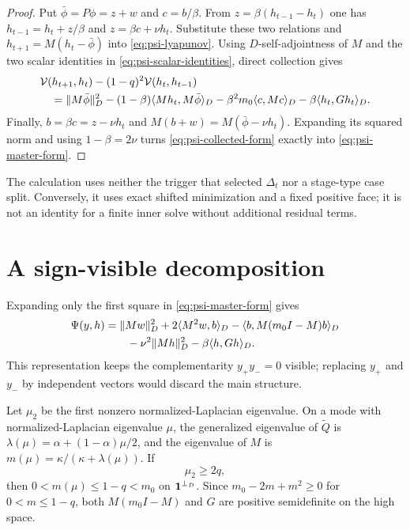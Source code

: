 \documentclass[11pt]{article}
\begin{document}
\begin{proof}
Put $\bar\phi=P\phi=z+w$ and $c=b/\beta$.  From
$z=\beta(h_{t-1}-h_t)$ one has
$h_{t-1}=h_t+z/\beta$ and $z=\beta c+\nu h_t$.
Substitute these two relations and
$h_{t+1}=M(h_t-\bar\phi)$ into \cref{eq:psi-lyapunov}.  Using
$D$-self-adjointness of $M$ and the two scalar identities in
\cref{eq:psi-scalar-identities}, direct collection gives
\begin{align}
 &\mathcal V(h_{t+1},h_t)-(1-q)^2\mathcal V(h_t,h_{t-1})\notag\\
 &\quad=\lVert M\bar\phi\rVert_D^2
 -(1-\beta)\langle Mh_t,M\bar\phi\rangle_D
 -\beta^2m_0\langle c,Mc\rangle_D
 -\beta\langle h_t,Gh_t\rangle_D.
 \label{eq:psi-collected-form}
\end{align}
Finally, $b=\beta c=z-\nu h_t$ and
$M(b+w)=M(\bar\phi-\nu h_t)$.  Expanding its squared norm and using
$1-\beta=2\nu$ turns \cref{eq:psi-collected-form} exactly into
\cref{eq:psi-master-form}.
\end{proof}

The calculation uses neither the trigger that selected $\Delta_t$ nor a
stage-type case split.  Conversely, it uses exact shifted minimization and a
fixed positive face; it is not an identity for a finite inner solve without
additional residual terms.

\section{A sign-visible decomposition}

Expanding only the first square in \cref{eq:psi-master-form} gives
\begin{align}
 \Psi(y,h)
 &=\lVert Mw\rVert_D^2+2\langle M^2w,b\rangle_D
   -\langle b,M(m_0I-M)b\rangle_D\notag\\
 &\qquad-\nu^2\lVert Mh\rVert_D^2-\beta\langle h,Gh\rangle_D.
 \label{eq:psi-slack-decomposition}
\end{align}
This representation keeps the complementarity $y_+y_-=0$ visible; replacing
$y_+$ and $y_-$ by independent vectors would discard the main structure.

Let $\mu_2$ be the first nonzero normalized-Laplacian eigenvalue.  On a mode
with normalized-Laplacian eigenvalue $\mu$, the generalized eigenvalue of
$\widetilde Q$ is
$\lambda(\mu)=\alpha+(1-\alpha)\mu/2$, and the eigenvalue of $M$ is
$m(\mu)=\kappa/(\kappa+\lambda(\mu))$.  If
\begin{equation}
 \mu_2\geq2q,
 \label{eq:psi-hgap}
\end{equation}
then $0<m(\mu)\leq1-q<m_0$ on $\mathbf{1}^{\perp_D}$.  Since
$m_0-2m+m^2\geq0$ for $0<m\leq1-q$, both
$M(m_0I-M)$ and $G$ are positive semidefinite on the high space.
\end{document}
